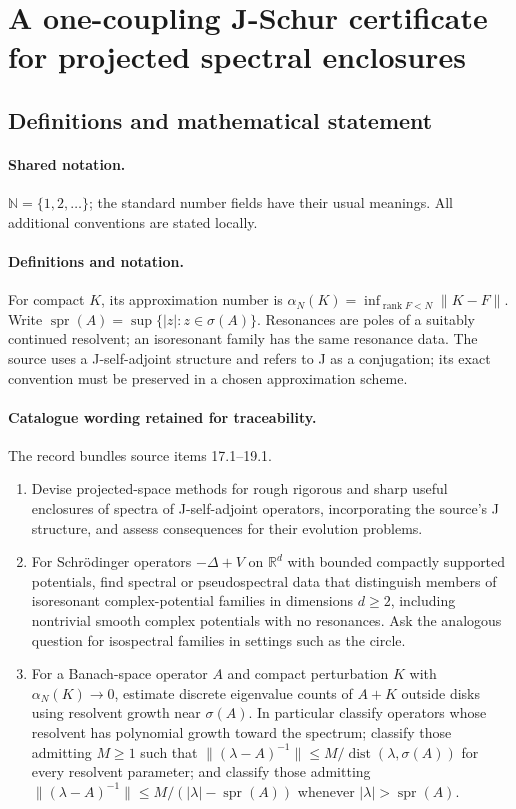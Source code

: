 \documentclass[11pt]{article}
\begin{document}
\section{A one-coupling J-Schur certificate for projected spectral enclosures}\label{statement}

\subsection{Definitions and mathematical statement}

\paragraph{Shared notation.}$\mathbb N=\{1,2,\ldots\}$; the standard number fields have their usual meanings. All additional conventions are stated locally.


\paragraph{Definitions and notation.}For compact $K$, its approximation number is $\alpha_N(K)=\inf_{\operatorname{rank}F<N}\|K-F\|$. Write $\operatorname{spr}(A)=\sup\{|z|:z\in\sigma(A)\}$. Resonances are poles of a suitably continued resolvent; an isoresonant family has the same resonance data. The source uses a J-self-adjoint structure and refers to J as a conjugation; its exact convention must be preserved in a chosen approximation scheme.

\paragraph{Catalogue wording retained for traceability.}
The record bundles source items 17.1--19.1.
\begin{enumerate}
\item Devise projected-space methods for rough rigorous and sharp useful enclosures of spectra of J-self-adjoint operators, incorporating the source’s J structure, and assess consequences for their evolution problems.
\item For Schrödinger operators $-\Delta+V$ on $\mathbb R^d$ with bounded compactly supported potentials, find spectral or pseudospectral data that distinguish members of isoresonant complex-potential families in dimensions $d\ge2$, including nontrivial smooth complex potentials with no resonances. Ask the analogous question for isospectral families in settings such as the circle.
\item For a Banach-space operator $A$ and compact perturbation $K$ with $\alpha_N(K)\to0$, estimate discrete eigenvalue counts of $A+K$ outside disks using resolvent growth near $\sigma(A)$. In particular classify operators whose resolvent has polynomial growth toward the spectrum; classify those admitting $M\ge1$ such that $\|(\lambda-A)^{-1}\|\le M/\operatorname{dist}(\lambda,\sigma(A))$ for every resolvent parameter; and classify those admitting $\|(\lambda-A)^{-1}\|\le M/(|\lambda|-\operatorname{spr}(A))$ whenever $|\lambda|>\operatorname{spr}(A)$.
\end{enumerate}
\end{document}
